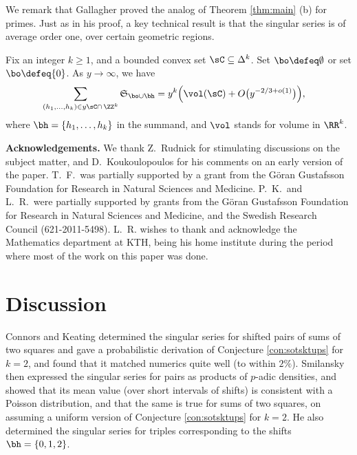 \documentclass[12pt, reqno, twoside, letterpaper]{amsart}
\begin{document}
We remark that Gallagher \cite{GAL:76} proved the analog of 
Theorem \ref{thm:main} (b) for primes.
%
Just as in his proof, a key technical result is that the singular 
series is of average order one, over certain geometric regions.

\begin{proposition}
 \label{prop:sssa}
%
Fix an integer $k \ge 1$, and a bounded convex set 
$\sC \subseteq \Delta^k$.
%
Set $\bo \defeq \emptyset$ or set $\bo \defeq \{0\}$.
%
As $y \to \infty$, we have  
\begin{align}
 \label{eq:sssa}
  \sum_{(h_1,\ldots,h_k) \in y\sC \cap \, \ZZ^k} 
   \mathfrak{S}_{\bo \cup \bh} 
   & =
    y^k \Big( \vol(\sC) + O\big(y^{-2/3 + o(1)}\big)\Big), 
\end{align}
where $\bh = \{h_1,\ldots,h_k\}$ in the summand, and $\vol$ 
stands for volume in $\RR^k$.
\end{proposition}

{\bfseries Acknowledgements.} 
%
We thank Z.\ Rudnick for stimulating discussions on the subject 
matter, and D.\ Koukoulopoulos for his comments on an early 
version of the paper.
%
T.\ F.\ was partially supported by a grant from the G\"oran 
Gustafsson Foundation for Research in Natural Sciences and 
Medicine.
%
P.\ K.\ and L.\ R.\  were partially supported by grants from the 
G\"oran Gustafsson Foundation for Research in Natural Sciences and 
Medicine, and the Swedish Research Council (621-2011-5498).
%
L.\ R. wishes to thank and acknowledge the Mathematics department at KTH, being his home institute during the period where most of the work on this paper was done.


\section{Discussion}
\label{sec:discussion}

Connors and Keating \cite{CK:97} determined the singular series 
for shifted pairs of sums of two squares and gave a probabilistic
derivation of Conjecture \ref{con:sotsktups} for $k = 2$, and 
found that it matched numerics quite well (to within $2\%$).
%
Smilansky \cite{SMI:13} then expressed the singular series for 
pairs as products of $p$-adic densities, and showed that its mean 
value (over short intervals of shifts) is consistent with a 
Poisson distribution, and that the same is true for sums of two 
squares, on assuming a uniform version of 
Conjecture \ref{con:sotsktups} for $k = 2$.  
%
He also determined the singular series for triples corresponding 
to the shifts $\bh = \{0,1,2\}$.
%
\end{document}
